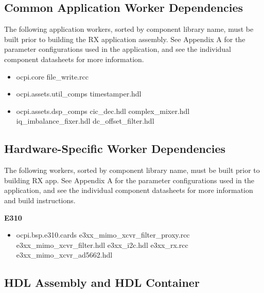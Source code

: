 \subsection{Common Application Worker Dependencies}
The following application workers, sorted by component library name, must be built prior to building the RX application assembly. See Appendix A for the parameter configurations used in the application, and see the individual component datasheets for more information.\par\bigskip
	\begin{minipage}[t]{.5\textwidth}
	\begin{itemize}
		\item ocpi.core
			\subitem file\_write.rcc
		\item ocpi.assets.util\_comps
			\subitem timestamper.hdl
		\item ocpi.assets.dsp\_comps
			\subitem cic\_dec.hdl
			\subitem complex\_mixer.hdl
			\subitem iq\_imbalance\_fixer.hdl
			\subitem dc\_offset\_filter.hdl
	\end{itemize}
	\end{minipage}

\subsection{Hardware-Specific Worker Dependencies}
The following workers, sorted by component library name, must be built prior to building RX app. See Appendix A for the parameter configurations used in the application, and see the individual component datasheets for more information and build instructions.\par\bigskip
	\begin{minipage}[t]{\textwidth}
	\textbf{E310}
	\begin{itemize}
		\item ocpi.bsp.e310.cards
			\subitem e3xx\_mimo\_xcvr\_filter\_proxy.rcc
			\subitem e3xx\_mimo\_xcvr\_filter.hdl
			\subitem e3xx\_i2c.hdl
			\subitem e3xx\_rx.rcc
			\subitem e3xx\_mimo\_xcvr\_ad5662.hdl
	\end{itemize}
	\end{minipage} \medskip

\newpage

\subsection{HDL Assembly and HDL Container}
\assetsdoc
